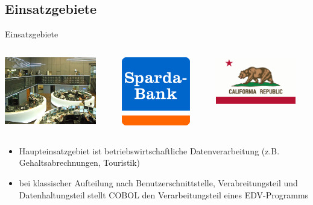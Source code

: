 \documentclass[handout]{beamer}
\begin{document}
\subsection{Einsatzgebiete}
\begin{frame}{Einsatzgebiete}
	\pause
	\begin{columns}[t]
		\begin{column}{4cm}
			\includegraphics[width=4cm]{Deutsche-boerse}
		\end{column}
	\pause
		\begin{column}{3cm}
			\includegraphics[width=3cm]{sparda_logo}
		\end{column}
	\pause
		\begin{column}{3.5cm}
			\includegraphics[width=3.5cm]{california-state-flag1} 
		\end{column}
	\end{columns}
	\pause
	\begin{itemize}[<+->]
		\item
			Haupteinsatzgebiet ist betriebswirtschaftliche Datenverarbeitung (z.B. Gehaltsabrechnungen, Touristik)
		\item
			bei klassischer Aufteilung nach Benutzerschnittstelle, Verabreitungsteil und Datenhaltungsteil stellt COBOL den Verarbeitungsteil eines EDV-Programms
	\end{itemize}
\end{frame}
\end{document}
